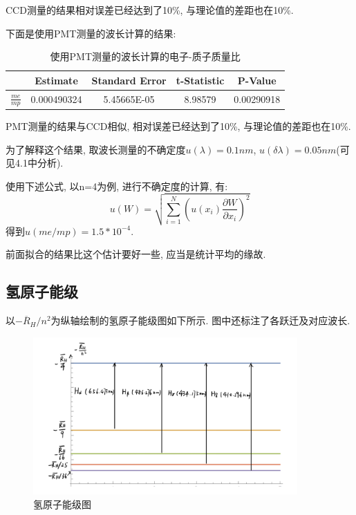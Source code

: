 \documentclass[12pt,a4paper]{article}
\begin{document}
CCD测量的结果相对误差已经达到了10\%, 与理论值的差距也在10\%.

下面是使用PMT测量的波长计算的结果:
\begin{table}[H]
    \centering
    \begin{tabular}{|c|c|c|c|c|}
    \hline
      & Estimate    & Standard Error & t-Statistic & P-Value    \\ \hline
      $\frac{me}{mp}$ & 0.000490324 & 5.45665E-05    & 8.98579     & 0.00290918 \\ \hline
    \end{tabular}
    \caption{使用PMT测量的波长计算的电子-质子质量比}
    \end{table}

PMT测量的结果与CCD相似, 相对误差已经达到了10\%, 与理论值的差距也在10\%.

为了解释这个结果, 取波长测量的不确定度$u(\lambda)=0.1nm$, $u(\delta \lambda)=0.05nm$(可见4.1中分析). 

使用下述公式, 以n=4为例, 进行不确定度的计算, 有: 
\begin{equation}
u(W)=\sqrt{\sum_{i=1}^{N}\left(u\left(x_{i}\right) \frac{\partial W}{\partial x_{i}}\right)^{2}}
\end{equation}
得到$u(me/mp)=1.5*10^{-4}$. 

前面拟合的结果比这个估计要好一些, 应当是统计平均的缘故. 

\subsection{氢原子能级}
以$-\overline R_{H}/n^2$为纵轴绘制的氢原子能级图如下所示. 图中还标注了各跃迁及对应波长. 
\begin{figure}[H]
    \centering
    \includegraphics[width=0.9\textwidth]{氢原子能级.jpg}
    \caption{氢原子能级图}
\end{figure}
\end{document}
